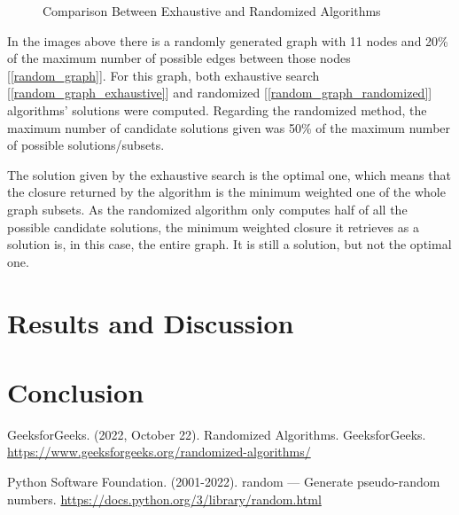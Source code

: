 \documentclass[...]{revdetua}
\begin{document}
\begin{figure}[htp]
\caption{Comparison Between Exhaustive and Randomized Algorithms}

\end{figure}

In the images above there is a randomly generated graph with 11 nodes and 20\% of the maximum number of possible edges between those nodes [\ref{random_graph}]. For this graph, both exhaustive search [\ref{random_graph_exhaustive}] and randomized [\ref{random_graph_randomized}] algorithms' solutions were computed. Regarding the randomized method, the maximum number of candidate solutions given was 50\% of the maximum number of possible solutions/subsets.

The solution given by the exhaustive search is the optimal one, which means that the closure returned by the algorithm is the minimum weighted one of the whole graph subsets. As the randomized algorithm only computes half of all the possible candidate solutions, the minimum weighted closure it retrieves as a solution is, in this case, the entire graph. It is still a solution, but not the optimal one.

\section{Results and Discussion}



\section{Conclusion}

\begin{thebibliography}{9}

GeeksforGeeks. (2022, October 22). Randomized Algorithms. GeeksforGeeks. \url{https://www.geeksforgeeks.org/randomized-algorithms/}

Python Software Foundation. (2001-2022). random — Generate pseudo-random numbers. 
\url{https://docs.python.org/3/library/random.html}


\end{thebibliography}


\end{document}
